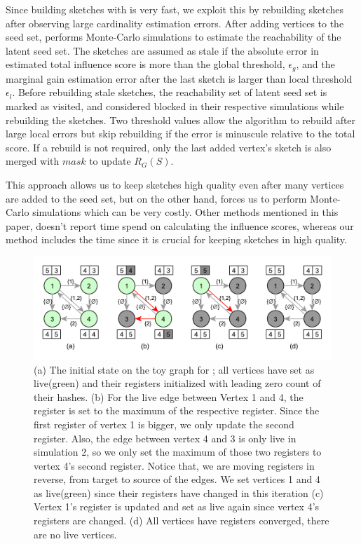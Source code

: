 \documentclass[10pt,journal,compsoc]{IEEEtran}
\newcommand\acro{{\sc{HyperFuseR\xspace}\xspace}\xspace}
\begin{document}
Since building sketches with \acro is very fast, we exploit this by rebuilding sketches after observing large cardinality estimation errors.
After adding vertices to the seed set, \acro performs Monte-Carlo simulations to estimate the reachability of the latent seed set.
The sketches are assumed as stale if the absolute error in estimated total influence score is more than the global threshold, $\epsilon_{g}$, and the marginal gain estimation error after the last sketch is larger than local threshold $\epsilon_{l}$. Before rebuilding stale sketches, the reachability set of latent seed set is marked as visited, and considered blocked in their respective simulations while rebuilding the sketches. Two threshold values allow the algorithm to rebuild after large local errors but skip rebuilding if the error is minuscule relative to the total score. If a rebuild is not required, only the last added vertex's sketch is also merged with $mask$ to update $R_G(S)$.

This approach allows us to keep sketches high quality even after many vertices are added to the seed set, but on the other hand, forces us to perform Monte-Carlo simulations which can be very costly. Other methods mentioned in this paper, doesn't report time spend on calculating the influence scores, whereas our method includes the time since it is crucial for keeping sketches in high quality.


\begin{figure}[!ht]
\begin{center}
\includegraphics[width=\linewidth]{images/sketch-diffusion.pdf}
\caption{(a) The initial state on the toy graph for \acro{}; all vertices have set as live(green) and their registers initialized with leading zero count of their hashes. (b) 
For the live edge between Vertex 1 and 4, the register is set to the maximum of the respective register. Since the first register of vertex 1 is bigger, we only update the second register. Also, the edge between vertex 4 and 3 is only live in simulation 2, so we only set the maximum of those two registers to vertex 4's second register. Notice that, we are moving registers in reverse, from target to source of the edges. We set vertices 1 and 4 as live(green) since their registers have changed in this iteration (c) Vertex 1's register is updated and set as live again since vertex 4's registers are changed.  (d) All vertices have registers converged, there are no live vertices. }\label{fig:hf-processing} 
\end{center}
\end{figure}
\end{document}
